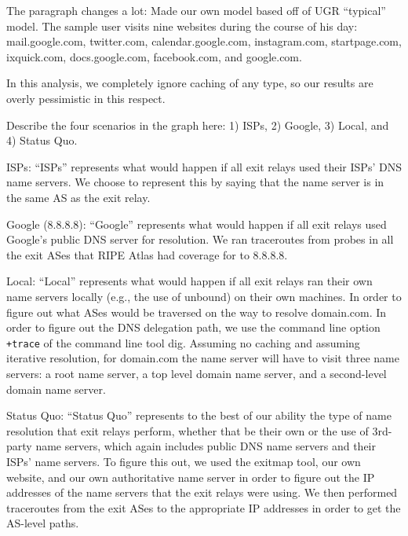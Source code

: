 The paragraph changes a lot: Made our own model based off of UGR ``typical'' model.  
The sample user visits nine websites during the course of his day: mail.google.com, 
twitter.com, calendar.google.com, instagram.com, startpage.com, ixquick.com, docs.google.com, 
facebook.com, and google.com.

In this analysis, we completely ignore caching of any type, so our results are overly 
pessimistic in this respect. 

Describe the four scenarios in the graph here: 1) ISPs, 2) Google, 3) Local, and 
4) Status Quo.

ISPs: ``ISPs'' represents what would happen if all exit relays used their ISPs' DNS name 
servers.  We choose to represent this by saying that the name server is in the same AS as the 
exit relay.

Google (8.8.8.8): ``Google'' represents what would happen if all exit relays used 
Google's public DNS server for resolution. We ran traceroutes from probes in all the exit 
ASes that RIPE Atlas had coverage for to 8.8.8.8.

Local: ``Local'' represents what would happen if all exit relays ran their own name 
servers locally (e.g., the use of unbound) on their own machines. In order to figure out 
what ASes would be traversed on the way to resolve domain.com. In order to figure out the 
DNS delegation path, we use the command line option \texttt{+trace} of the
command line tool dig. Assuming no caching and assuming 
iterative resolution, for domain.com the name server will have to visit three name servers:
a root name server, a top level domain name server, and a second-level domain name server. 

Status Quo: ``Status Quo'' represents to the best of our ability the type of name resolution 
that exit relays perform, whether that be their own or the use of 3rd-party name servers, 
which again includes public DNS name servers and their ISPs' name servers. To figure this 
out, we used the exitmap tool, our own website, and our own authoritative name server 
in order to figure out the IP addresses of the name servers that the exit relays were 
using. We then performed traceroutes from the exit ASes to the appropriate IP addresses 
in order to get the AS-level paths.

